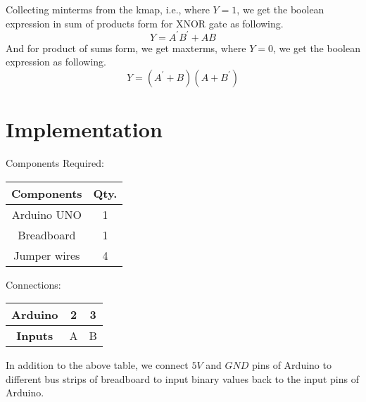 \documentclass[journal,12pt,twocolumn]{IEEEtran}
\begin{document}
Collecting minterms from the kmap, i.e., where $Y=1$, we get the boolean expression in sum of products form for XNOR gate as following.
\begin{equation}
	Y = A^{\prime}B^{\prime}  +  AB
\end{equation}
And for product of sums form, we get maxterms, where $Y=0$, we get the boolean expression as following.
\begin{equation}
	Y = (A^{\prime}+B)(A+B^{\prime})
\end{equation}
\newpage

\section{\textbf{Implementation}}
\bigskip

Components Required:
\begin{table}[h]
	\centering
	\begin{tabular}{|c|c|}
		\hline
		\textbf{Components}&\textbf{Qty.}\\
		\hline
		Arduino UNO&1\\
		\hline
		Breadboard&1\\
		\hline
		Jumper wires&4\\
		\hline
	\end{tabular}
\end{table}

Connections:
\begin{table}[h]
	\centering
	\begin{tabular}{|c|c|c|}
		\hline
		\textbf{Arduino}&2&3\\
		\hline
		\textbf{Inputs}&A&B\\
		\hline
	\end{tabular}
\end{table}

In addition to the above table, we connect $5V$ and $GND$ pins of Arduino to different bus strips of breadboard to input binary values back to the input pins of Arduino.
\end{document}
